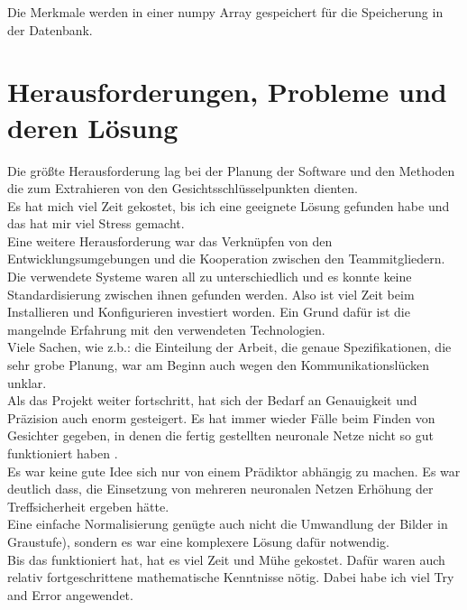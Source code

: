 Die Merkmale werden in einer numpy Array gespeichert für die
Speicherung in der Datenbank. \\



\section{Herausforderungen, Probleme und deren Lösung }



Die größte Herausforderung lag bei der Planung der Software und den Methoden
die zum Extrahieren von den Gesichtsschlüsselpunkten dienten.\\
Es hat mich viel Zeit gekostet, bis ich eine geeignete Lösung gefunden habe und
das hat mir viel Stress gemacht. \\
Eine weitere Herausforderung war das Verknüpfen von den Entwicklungsumgebungen
und die Kooperation zwischen den Teammitgliedern. \\
Die verwendete Systeme waren all zu unterschiedlich und es konnte keine
Standardisierung zwischen ihnen gefunden werden. Also ist viel Zeit beim
Installieren und Konfigurieren investiert worden. Ein Grund dafür ist die
mangelnde Erfahrung mit den verwendeten Technologien. 
\\

Viele Sachen, wie z.b.: die Einteilung der Arbeit, die genaue Spezifikationen,
die sehr grobe Planung, war am Beginn auch wegen den
Kommunikationslücken unklar. 
\\

Als das Projekt weiter fortschritt, hat sich der Bedarf an Genauigkeit und Präzision
auch enorm gesteigert.
Es hat immer wieder Fälle beim Finden von Gesichter gegeben, in denen die fertig gestellten neuronale Netze
nicht so gut funktioniert haben . 
\\

Es war keine gute Idee sich nur von einem Prädiktor abhängig
zu machen. 
Es war deutlich dass, die Einsetzung von mehreren neuronalen Netzen Erhöhung der Treffsicherheit ergeben hätte.
\\

Eine einfache Normalisierung genügte auch nicht die Umwandlung der Bilder in
Graustufe), sondern es war eine komplexere Lösung dafür notwendig.
\\
Bis das funktioniert hat, hat es viel Zeit und Mühe gekostet. 
Dafür waren auch relativ fortgeschrittene mathematische Kenntnisse nötig.
Dabei habe ich viel Try and Error angewendet.
\\
 
